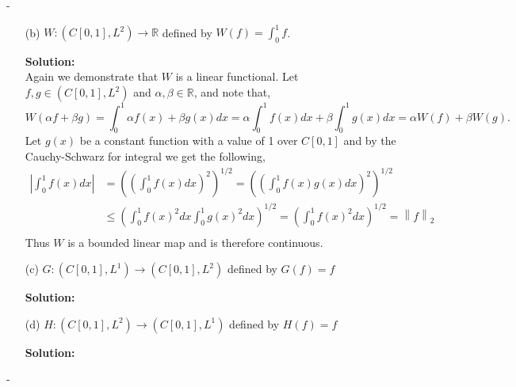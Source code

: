 \documentclass[12pt]{article}
\makeatletter
\theoremstyle{ex215}
\newcounter{probcount}
\newlength\probsep
\newlength\pshrinking
\newenvironment{problems}%
  {\ifhmode\unskip\par\fi\setcounter{probcount}{0}\probsep\parskip
  \sbox\@tempboxa{\textbf{9.}}\pshrinking\wd\@tempboxa\advance\pshrinking\labelsep
  \advance\linewidth -\pshrinking
  \advance\@totalleftmargin\pshrinking
  \advance\leftskip\pshrinking}%
  {\ifhmode\unskip \par\fi\advance\leftskip-\pshrinking}%
\newcommand{\localhead}[1]{\par\smallskip\textbf{#1}\nobreak\\}%
\newcommand\solution{\localhead{Solution:}}
\newcommand{\Reals}{\ensuremath{\mathbb R}}
\newcommand{\norm}[2]{\left \lVert #1 \right \rVert_{#2}}
\newcommand{\abs}[1]{\left| #1 \right|}
\let\RR\Reals
\makeatother
\begin{document}
\begin{problems}
\begin{enumerate}
  \item[(b)] $W: (C[0, 1], L^2) \to \RR$ defined by $W(f) = \int_0^1 f$.
  \solution Again we demonstrate that $W$ is a linear functional. Let $f, g \in (C[0, 1], L^2)$ and $\alpha, \beta \in \RR$,
  and note that, 
  \begin{equation*}
    W(\alpha f + \beta g) = \int_0^1 \alpha f(x) + \beta g(x) dx = \alpha \int_0^1f(x)dx + \beta \int_0^1g(x) dx = \alpha W(f) + \beta W(g). 
  \end{equation*} 
  Let $g(x)$ be a constant function with a value of 1 over $C[0,1]$ and by the Cauchy-Schwarz for integral we get the following, 
  \begin{align*}
    \abs{\int_0^1 f(x)dx} &= \left(\left(\int_0^1 f(x)dx\right)^2 \right)^{1/2} = \left(\left(\int_0^1 f(x)g(x)dx \right)^2 \right)^{1/2}\\ 
    &\leq \left(\int_0^1 f(x)^2 dx \int_0^1 g(x)^2dx\right)^{1/2} = \left(\int_0^1 f(x)^2 dx\right)^{1/2} = \norm{f}{2} \\
  \end{align*}
  Thus $W$ is a bounded linear map and is therefore continuous. 


  \item[(c)] $G: (C[0, 1], L^1) \to (C[0, 1], L^2)$ defined by $G(f) = f$
  \solution


  \item[(d)] $H: (C[0, 1], L^2) \to (C[0, 1], L^1)$ defined by $H(f) = f$
  \solution
  
\end{enumerate}
\newpage






\end{problems}
\end{document}
